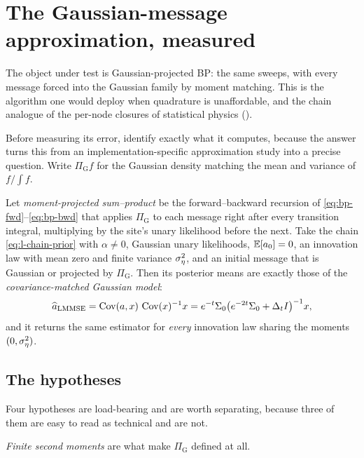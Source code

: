 \section{The Gaussian-message approximation, measured}\label{sec:l-closure}

The object under test is Gaussian-projected BP: the same sweeps, with
every message forced into the Gaussian family by moment matching. This is
the algorithm one would deploy when quadrature is unaffordable, and the
chain analogue of the per-node closures of statistical physics
(\compendium{}).

Before measuring its error, identify exactly what it computes,
because the answer turns this from an implementation-specific approximation
study into a precise question. Write $\Pi_{\mathrm{G}} f$ for the Gaussian
density matching the mean and variance of $f/\!\int\! f$.

\begin{theorem}
\label{thm:l-lmmse}
Let \emph{moment-projected sum--product} be the forward--backward recursion
of \eqref{eq:bp-fwd}--\eqref{eq:bp-bwd} that applies $\Pi_{\mathrm{G}}$ to each
message right after every transition integral, multiplying by the site's unary
likelihood before the next. Take the chain \eqref{eq:l-chain-prior} with
$\alpha \neq 0$, Gaussian unary likelihoods, $\mathbb{E}[a_0] = 0$, an innovation law
with mean zero and finite variance $\sigma_\eta^2$, and an initial message that is Gaussian
or projected by $\Pi_{\mathrm{G}}$. Then its posterior means are exactly those
of the \emph{covariance-matched Gaussian model}:
\begin{equation}
  \widehat{a}_{\mathrm{LMMSE}}
  = \operatorname{Cov}(a,x)\,\operatorname{Cov}(x)^{-1} x
  = e^{-t}\Sigma_0\big(e^{-2t}\Sigma_0 + \Delta_t I\big)^{-1} x ,
  \label{eq:l-lmmse}
\end{equation}
and it returns the same estimator for \emph{every} innovation law sharing the
moments $(0, \sigma_\eta^2)$.
\end{theorem}

\subsection{The hypotheses}\label{sec:lmmse-hyp}

Four hypotheses are load-bearing and are worth separating, because three of
them are easy to read as technical and are not.

\emph{Finite second moments} are what make $\Pi_{\mathrm{G}}$ defined at all.

